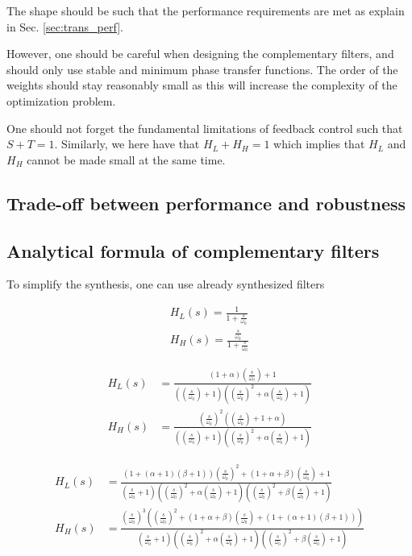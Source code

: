 \documentclass[9pt, technote, a4paper]{ieeeconf}
\begin{document}
The shape should be such that the performance requirements are met as explain in Sec. \ref{sec:trans_perf}.

However, one should be careful when designing the complementary filters, and should only use stable and minimum phase transfer functions.
The order of the weights should stay reasonably small as this will increase the complexity of the optimization problem.

One should not forget the fundamental limitations of feedback control such that \(S + T = 1\).
Similarly, we here have that \(H_L + H_H = 1\) which implies that \(H_L\) and \(H_H\) cannot be made small at the same time.

\subsection{Trade-off between performance and robustness}
\label{sec:orgafc6c17}

\subsection{Analytical formula of complementary filters}
\label{sec:orgd297585}
  \label{sec:analytical_complementary_filters}
To simplify the synthesis, one can use already synthesized filters

\begin{align}
  H_L(s) = \frac{1}{1 + \frac{s}{\omega_0}}\\
  H_H(s) = \frac{\frac{s}{\omega_0}}{1 + \frac{s}{\omega_0}}
\end{align}

\begin{align}
  H_L(s) &= \frac{(1+\alpha) (\frac{s}{\omega_0})+1}{\left((\frac{s}{\omega_0})+1\right) \left((\frac{s}{\omega_0})^2 + \alpha (\frac{s}{\omega_0}) + 1\right)}\\
  H_H(s) &= \frac{(\frac{s}{\omega_0})^2 \left((\frac{s}{\omega_0})+1+\alpha\right)}{\left((\frac{s}{\omega_0})+1\right) \left((\frac{s}{\omega_0})^2 + \alpha (\frac{s}{\omega_0}) + 1\right)}
\end{align}

\begin{align}
  H_L(s) &= \frac{\left(1+(\alpha+1)(\beta+1)\right) (\frac{s}{\omega_0})^2 + (1+\alpha+\beta)(\frac{s}{\omega_0}) + 1}{\left(\frac{s}{\omega_0} + 1\right) \left( (\frac{s}{\omega_0})^2 + \alpha (\frac{s}{\omega_0}) + 1 \right) \left( (\frac{s}{\omega_0})^2 + \beta (\frac{s}{\omega_0}) + 1 \right)}\\
  H_H(s) &= \frac{(\frac{s}{\omega_0})^3 \left( (\frac{s}{\omega_0})^2 + (1+\alpha+\beta) (\frac{s}{\omega_0}) + (1+(\alpha+1)(\beta+1)) \right)}{\left(\frac{s}{\omega_0} + 1\right) \left( (\frac{s}{\omega_0})^2 + \alpha (\frac{s}{\omega_0}) + 1 \right) \left( (\frac{s}{\omega_0})^2 + \beta (\frac{s}{\omega_0}) + 1 \right)}
\end{align}
\end{document}
